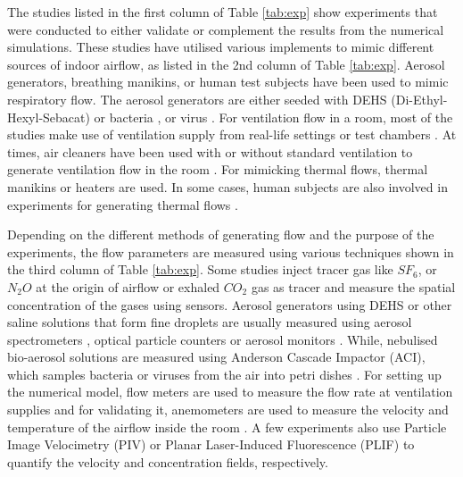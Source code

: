 \documentclass[a4paper,12pt]{elsarticle}
\begin{document}
The studies listed in the first column of Table \ref{tab:exp} show experiments that were conducted to either validate or complement the results from the numerical simulations. These studies have utilised various implements to mimic different sources of indoor airflow, as listed in the 2nd column of Table \ref{tab:exp}. Aerosol generators, breathing manikins, or human test subjects have been used to mimic respiratory flow. The aerosol generators are either seeded with DEHS (Di-Ethyl-Hexyl-Sebacat) \cite{jain2023numerical} or bacteria \cite{liu2020full}, or virus \cite{oksanen2022combining}. For ventilation flow in a room, most of the studies make use of ventilation supply from real-life settings \cite{romano2015numerical,duill2021impact} or test chambers \cite{zhang2019distribution, berrouk2010experimental}. At times, air cleaners have been used with or without standard ventilation to generate ventilation flow in the room \cite{oksanen2022combining, jain2023numerical}. For mimicking thermal flows, thermal manikins \cite{li2021effects} or heaters \cite{ho2021modeling} are used. In some cases, human subjects are also involved in experiments for generating thermal flows \cite{li2005role, deng2021control}.

Depending on the different methods of generating flow and the purpose of the experiments, the flow parameters are measured using various techniques shown in the third column of Table \ref{tab:exp}. Some studies inject tracer gas like $SF_6$, or $N_2O$ at the origin of airflow \cite{qian2008dispersion, cheng2021experimental} or exhaled $CO_2$ gas as tracer \cite{deng2021control} and measure the spatial concentration of the gases using sensors. Aerosol generators using DEHS or other saline solutions that form fine droplets are usually measured using aerosol spectrometers \cite{duill2021impact}, optical particle counters \cite{berrouk2010experimental} or aerosol monitors \cite{zhou2021experimental}. While, nebulised bio-aerosol solutions are measured using Anderson Cascade Impactor (ACI), which samples bacteria or viruses from the air into petri dishes \cite{liu2020full,liu2020experimental}. For setting up the numerical model, flow meters are used to measure the flow rate at ventilation supplies \cite{li2005role,liu2023estimating} and for validating it, anemometers are used to measure the velocity and temperature of the airflow inside the room \cite{li2023numerical,arpino2023cfd}. A few experiments also use Particle Image Velocimetry (PIV) \cite{faleiros2022tu} or Planar Laser-Induced Fluorescence (PLIF) \cite{poussou2010flow} to quantify the velocity and concentration fields, respectively.
\end{document}
